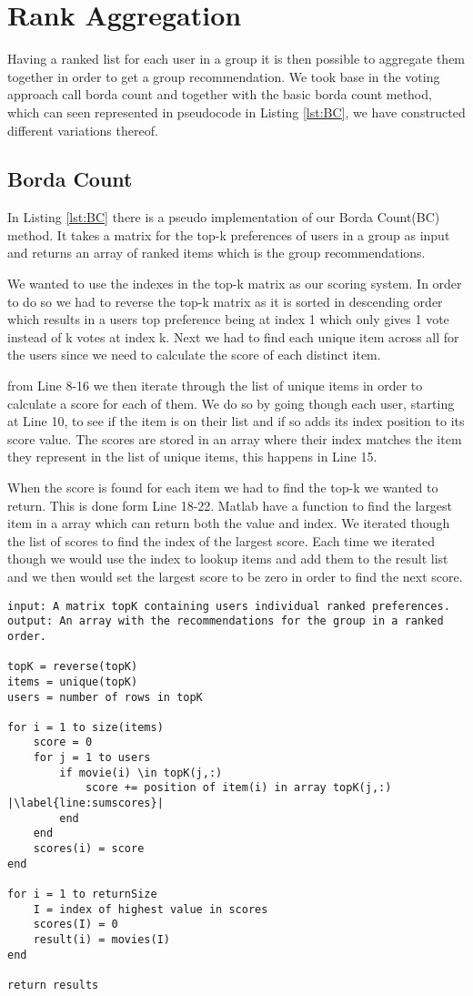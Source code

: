 \section{Rank Aggregation}\label{sec:rank_aggregation}
Having a ranked list for each user in a group it is then possible to aggregate them together in order to get a group recommendation. We took base in the voting approach call borda count and together with the basic borda count method, which can seen represented in pseudocode in Listing \ref{lst:BC}, we have constructed different variations thereof. 
\subsection{Borda Count}
In Listing \ref{lst:BC} there is a pseudo implementation of our Borda Count(BC) method. It takes a matrix for the top-k preferences of users in a group as input and returns an array of ranked items which is the group recommendations. 

We wanted to use the indexes in the top-k matrix as our scoring system. In order to do so we had to reverse the top-k matrix as it is sorted in descending order which results in a users top preference being at index 1 which only gives 1 vote instead of k votes at index k. Next we had to find each unique item across all for the users since we need to calculate the score of each distinct item.

from Line 8-16 we then iterate through the list of unique items in order to calculate a score for each of them. We do so by going though each user, starting at Line 10, to see if the item is on their list and if so adds its index position to its score value. The scores are stored in an array where their index matches the item they represent in the list of unique items, this happens in Line 15.

When the score is found for each item we had to find the top-k we wanted to return. This is done form Line 18-22. Matlab have a function to find the largest item in a array which can return both the value and index. We iterated though the list of scores to find the index of the largest score. Each time we iterated though we would use the index to lookup items and add them to the result list and we then would set the largest score to be zero in order to find the next score. 
\begin{lstlisting}[caption={Borda count implementation},label=lst:BC,escapechar=|]
input: A matrix topK containing users individual ranked preferences.
output: An array with the recommendations for the group in a ranked order.

topK = reverse(topK)
items = unique(topK)
users = number of rows in topK

for i = 1 to size(items)
	score = 0
	for j = 1 to users
		if movie(i) \in topK(j,:)
			score += position of item(i) in array topK(j,:) |\label{line:sumscores}|
		end
	end
	scores(i) = score
end

for i = 1 to returnSize
	I = index of highest value in scores
	scores(I) = 0
	result(i) = movies(I)
end

return results

\end{lstlisting}

